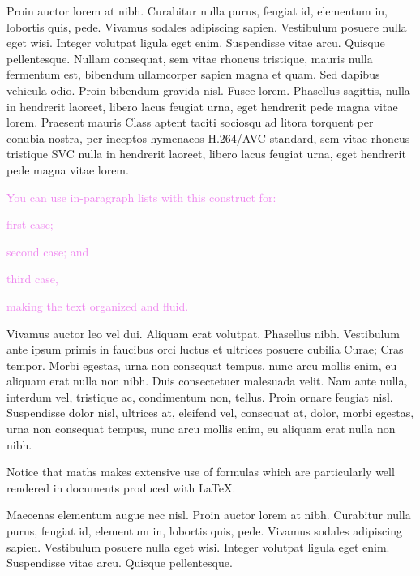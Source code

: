 Proin auctor lorem at nibh. Curabitur nulla purus, feugiat id, elementum in, lobortis quis, pede. Vivamus sodales adipiscing sapien. Vestibulum posuere nulla eget wisi. Integer volutpat ligula eget enim. Suspendisse vitae arcu. Quisque pellentesque. Nullam consequat, sem vitae rhoncus tristique, mauris nulla fermentum est, bibendum ullamcorper sapien magna et quam. Sed dapibus vehicula odio. Proin bibendum gravida nisl. Fusce lorem. Phasellus sagittis, nulla in hendrerit laoreet, libero lacus feugiat urna, eget hendrerit pede magna vitae lorem. Praesent mauris Class aptent taciti sociosqu ad litora torquent per conubia nostra, per inceptos hymenaeos H.264\slash \ac{AVC} standard, sem vitae rhoncus tristique \ac{SVC} \cite{Fraunhofer-Heinrich-Hertz-Institute:2013fk,ISO:H-264} nulla in hendrerit laoreet, libero lacus feugiat urna, eget hendrerit pede magna vitae lorem.

\textcolor{violet}{You can use in-paragraph lists with this construct for: 
\begin{inparaenum}[(a)]
\item first case;
\item second case; and
\item third case,
\end{inparaenum}
making the text organized and fluid.}

Vivamus auctor leo vel dui. Aliquam erat volutpat. Phasellus nibh. Vestibulum ante ipsum primis in faucibus orci luctus et ultrices posuere cubilia Curae; Cras tempor. Morbi egestas, urna non consequat tempus, nunc arcu mollis enim, eu aliquam erat nulla non nibh. Duis consectetuer malesuada velit. Nam ante nulla, interdum vel, tristique ac, condimentum non, tellus. Proin ornare feugiat nisl. Suspendisse dolor nisl, ultrices at, eleifend vel, consequat at, dolor, morbi egestas, urna non consequat tempus, nunc arcu mollis enim, eu aliquam erat nulla non nibh.

Notice that \gls{maths} makes extensive use of \Glspl{formula} which are particularly well rendered in documents produced with \gls{LaTeX}.

Maecenas elementum augue nec nisl. Proin auctor lorem at nibh. Curabitur nulla purus, feugiat id, elementum in, lobortis quis, pede. Vivamus sodales adipiscing sapien. Vestibulum posuere nulla eget wisi. Integer volutpat ligula eget enim. Suspendisse vitae arcu. Quisque pellentesque.
